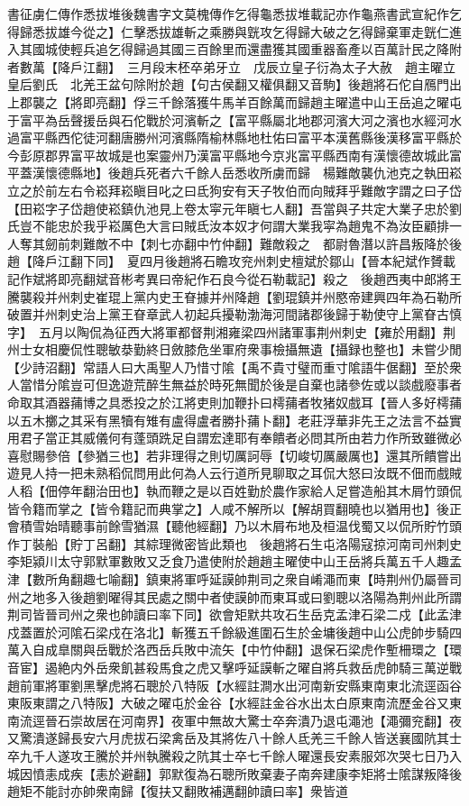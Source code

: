 書征虜仁傳作悉拔堆後魏書字文莫槐傳作乞得龜悉拔堆載記亦作龜燕書武宣紀作乞得歸悉拔雄今從之】仁擊悉拔雄斬之乘勝與皝攻乞得歸大破之乞得歸棄軍走皝仁進入其國城使輕兵追乞得歸過其國三百餘里而還盡獲其國重器畜產以百萬計民之降附者數萬【降戶江翻】　三月段末柸卒弟牙立　戊辰立皇子衍為太子大赦　趙主曜立皇后劉氏　北羌王盆句除附於趙【句古侯翻又權俱翻又音駒】後趙將石佗自鴈門出上郡襲之【將即亮翻】俘三千餘落獲牛馬羊百餘萬而歸趙主曜遣中山王岳追之曜屯于富平為岳聲援岳與石佗戰於河濱斬之【富平縣屬北地郡河濱大河之濱也水經河水過富平縣西佗徒河翻唐勝州河濱縣隋榆林縣地杜佑曰富平本漢舊縣後漢移富平縣於今彭原郡界富平故城是也案靈州乃漢富平縣地今京兆富平縣西南有漢懷德故城此富平蓋漢懷德縣地】後趙兵死者六千餘人岳悉收所虜而歸　楊難敵襲仇池克之執田崧立之於前左右令崧拜崧瞋目叱之曰氐狗安有天子牧伯而向賊拜乎難敵字謂之曰子岱【田崧字子岱趙使崧鎮仇池見上卷太寜元年瞋七人翻】吾當與子共定大業子忠於劉氏豈不能忠於我乎崧厲色大言曰賊氐汝本奴才何謂大業我寜為趙鬼不為汝臣顧排一人奪其劒前刺難敵不中【刺七亦翻中竹仲翻】難敵殺之　都尉魯潛以許昌叛降於後趙【降戶江翻下同】　夏四月後趙將石瞻攻兖州刺史檀斌於鄒山【晉本紀斌作贇載記作斌將即亮翻斌音彬考異曰帝紀作石良今從石勒載記】殺之　後趙西夷中郎將王騰襲殺并州刺史崔琨上黨内史王眘據并州降趙【劉琨鎮并州愍帝建興四年為石勒所破置并州刺史治上黨王眘章武人初起兵擾勒渤海河間諸郡後歸于勒使守上黨眘古慎字】　五月以陶侃為征西大將軍都督荆湘雍梁四州諸軍事荆州刺史【雍於用翻】荆州士女相慶侃性聰敏㳟勤終日斂膝危坐軍府衆事檢攝無遺【攝録也整也】未嘗少閒【少詩沼翻】常語人曰大禹聖人乃惜寸隂【禹不貴寸璧而重寸隂語牛倨翻】至於衆人當惜分隂豈可但逸遊荒醉生無益於時死無聞於後是自棄也諸參佐或以談戲廢事者命取其酒器蒱博之具悉投之於江將吏則加鞭扑曰樗蒱者牧猪奴戲耳【晉人多好樗蒱以五木擲之其采有黑犢有雉有盧得盧者勝扑蒱卜翻】老莊浮華非先王之法言不益實用君子當正其威儀何有蓬頭跣足自謂宏達耶有奉饋者必問其所由若力作所致雖微必喜慰賜參倍【參猶三也】若非理得之則切厲訶辱【切峻切厲嚴厲也】還其所饋嘗出遊見人持一把未熟稻侃問用此何為人云行道所見聊取之耳侃大怒曰汝既不佃而戲賊人稻【佃停年翻治田也】執而鞭之是以百姓勤於農作家給人足嘗造船其木屑竹頭侃皆令籍而掌之【皆令籍記而典掌之】人咸不解所以【解胡買翻曉也以猶用也】後正會積雪始晴聽事前餘雪猶濕【聽他經翻】乃以木屑布地及桓温伐蜀又以侃所貯竹頭作丁裝船【貯丁呂翻】其綜理微密皆此類也　後趙將石生屯洛陽寇掠河南司州刺史李矩潁川太守郭默軍數敗又乏食乃遣使附於趙趙主曜使中山王岳將兵萬五千人趣孟津【數所角翻趣七喻翻】鎮東將軍呼延謨帥荆司之衆自崤澠而東【時荆州仍屬晉司州之地多入後趙劉曜得其民處之關中者使謨帥而東耳或曰劉聰以洛陽為荆州此所謂荆司皆晉司州之衆也帥讀曰率下同】欲會矩默共攻石生岳克孟津石梁二戍【此孟津戍蓋置於河隂石梁戍在洛北】斬獲五千餘級進圍石生於金墉後趙中山公虎帥步騎四萬入自成臯關與岳戰於洛西岳兵敗中流矢【中竹仲翻】退保石梁虎作塹柵環之【環音宦】遏絶内外岳衆飢甚殺馬食之虎又擊呼延謨斬之曜自將兵救岳虎帥騎三萬逆戰趙前軍將軍劉黑擊虎將石聰於八特阪【水經註澗水出河南新安縣東南東北流逕函谷東阪東謂之八特阪】大破之曜屯於金谷【水經註金谷水出太白原東南流歷金谷又東南流逕晉石崇故居在河南界】夜軍中無故大驚士卒奔潰乃退屯澠池【澠彌兖翻】夜又驚潰遂歸長安六月虎拔石梁禽岳及其將佐八十餘人氐羌三千餘人皆送襄國阬其士卒九千人遂攻王騰於并州執騰殺之阬其士卒七千餘人曜還長安素服郊次哭七日乃入城因憤恚成疾【恚於避翻】郭默復為石聰所敗棄妻子南奔建康李矩將士隂謀叛降後趙矩不能討亦帥衆南歸【復扶又翻敗補邁翻帥讀曰率】衆皆道